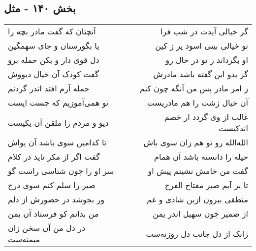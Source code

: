 \begin{center}
\section*{بخش ۱۴۰ - مثل}
\label{sec:sh140}
\begin{longtable}{l p{0.5cm} r}
آنچنان که گفت مادر بچه را
&&
گر خیالی آیدت در شب فرا
\\
یا بگورستان و جای سهمگین
&&
تو خیالی بینی اسود پر ز کین
\\
دل قوی دار و بکن حمله برو
&&
او بگرداند ز تو در حال رو
\\
گفت کودک آن خیال دیووش
&&
گر بدو این گفته باشد مادرش
\\
حمله آرم افتد اندر گردنم
&&
ز امر مادر پس من آنگه چون کنم
\\
تو همی‌آموزیم که چست ایست
&&
آن خیال زشت را هم مادریست
\\
دیو و مردم را ملقن آن یکیست
&&
غالب از وی گردد ار خصم اندکیست
\\
تا کدامین سوی باشد آن یواش
&&
الله‌الله رو تو هم زان سوی باش
\\
گفت اگر از مکر ناید در کلام
&&
حیله را دانسته باشد آن همام
\\
سر او را چون شناسی راست گو
&&
گفت من خامش نشینم پیش او
\\
صبر را سلم کنم سوی درج
&&
تا بر آیم صبر مفتاح الفرج
\\
ور بجوشد در حضورش از دلم
&&
منطقی بیرون ازین شادی و غم
\\
من بدانم کو فرستاد آن بمن
&&
از ضمیر چون سهیل اندر یمن
\\
در دل من آن سخن زان میمنه‌ست
&&
زانک از دل جانب دل روزنه‌ست
\\
\end{longtable}
\end{center}
